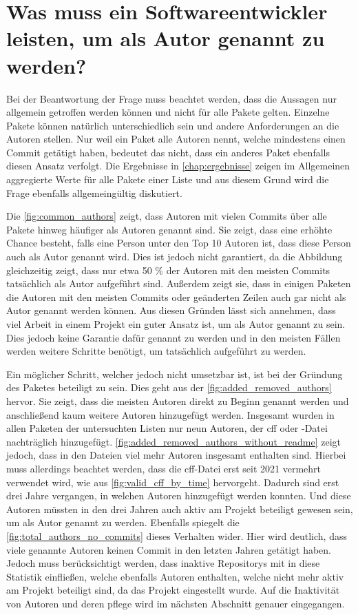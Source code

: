 \section{Was muss ein Softwareentwickler leisten, um als Autor genannt zu werden?}
\label{sec:zitationsfaehiger_autor_diskussion}
Bei der Beantwortung der Frage muss beachtet werden, dass die Aussagen nur allgemein getroffen werden können und nicht für alle Pakete gelten.
Einzelne Pakete können natürlich unterschiedlich sein und andere Anforderungen an die Autoren stellen.
Nur weil ein Paket alle Autoren nennt, welche mindestens einen Commit getätigt haben, bedeutet das nicht, dass ein anderes Paket ebenfalls diesen Ansatz verfolgt.
Die Ergebnisse in \autoref{chap:ergebnisse} zeigen im Allgemeinen aggregierte Werte für alle Pakete einer Liste und aus diesem Grund wird die Frage ebenfalls allgemeingültig diskutiert.

Die \autoref{fig:common_authors} zeigt, dass Autoren mit vielen Commits über alle Pakete hinweg häufiger als Autoren genannt sind.
Sie zeigt, dass eine erhöhte Chance besteht, falls eine Person unter den Top 10 Autoren ist, dass diese Person auch als Autor genannt wird.
Dies ist jedoch nicht garantiert, da die Abbildung gleichzeitig zeigt, dass nur etwa 50 \% der Autoren mit den meisten Commits tatsächlich als Autor aufgeführt sind.
Außerdem zeigt sie, dass in einigen Paketen die Autoren mit den meisten Commits oder geänderten Zeilen auch gar nicht als Autor genannt werden können.
Aus diesen Gründen lässt sich annehmen, dass viel Arbeit in einem Projekt ein guter Ansatz ist, um als Autor genannt zu sein.
Dies jedoch keine Garantie dafür genannt zu werden und in den meisten Fällen werden weitere Schritte benötigt, um tatsächlich aufgeführt zu werden.

Ein möglicher Schritt, welcher jedoch nicht umsetzbar ist, ist bei der Gründung des Paketes beteiligt zu sein.
Dies geht aus der \autoref{fig:added_removed_authors} hervor.
Sie zeigt, dass die meisten Autoren direkt zu Beginn genannt werden und anschließend kaum weitere Autoren hinzugefügt werden.
Insgesamt wurden in allen Paketen der untersuchten Listen nur neun Autoren, der \gls{cff} oder -Datei nachträglich hinzugefügt.
\autoref{fig:added_removed_authors_without_readme} zeigt jedoch, dass in den Dateien viel mehr Autoren insgesamt enthalten sind.
Hierbei muss allerdings beachtet werden, dass die \gls{cff}-Datei erst seit 2021 vermehrt verwendet wird, wie aus \autoref{fig:valid_cff_by_time} hervorgeht.
Dadurch sind erst drei Jahre vergangen, in welchen Autoren hinzugefügt werden konnten.
Und diese Autoren müssten in den drei Jahren auch aktiv am Projekt beteiligt gewesen sein, um als Autor genannt zu werden.
Ebenfalls spiegelt die \autoref{fig:total_authors_no_commits} dieses Verhalten wider.
Hier wird deutlich, dass viele genannte Autoren keinen Commit in den letzten Jahren getätigt haben.
Jedoch muss berücksichtigt werden, dass inaktive Repositorys mit in diese Statistik einfließen, welche ebenfalls Autoren enthalten, welche nicht mehr aktiv am Projekt beteiligt sind, da das Projekt eingestellt wurde.
Auf die Inaktivität von Autoren und deren pflege wird im nächsten Abschnitt genauer eingegangen.

